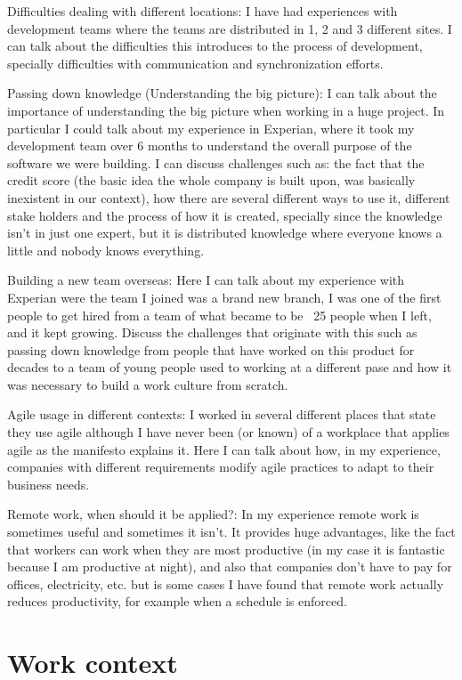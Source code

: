 \documentclass[12pt, letterpaper]{article}
\begin{document}
Difficulties dealing with different locations: I have had experiences with development teams where the teams are distributed in 1, 2 and 3 different sites. I can talk about the difficulties this introduces to the process of development, specially difficulties with communication and synchronization efforts.

Passing down knowledge (Understanding the big picture): I can talk about the importance of understanding the big picture when working in a huge project. In particular I could talk about my experience in Experian, where it took my development team over 6 months to understand the overall purpose of the software we were building. I can discuss challenges such as: the fact that the credit score (the basic idea the whole company is built upon, was basically inexistent in our context), how there are several different ways to use it, different stake holders and the process of how it is created, specially since the knowledge isn't in just one expert, but it is distributed knowledge where everyone knows a little and nobody knows everything.

Building a new team overseas: Here I can talk about my experience with Experian were the team I joined was a brand new branch, I was one of the first people to get hired from a team of what became to be ~25 people when I left, and it kept growing. Discuss the challenges that originate with this such as passing down knowledge from people that have worked on this product for decades to a team of young people used to working at a different pase and how it was necessary to build a work culture from scratch.

Agile usage in different contexts: I worked in several different places that state they use agile although I have never been (or known) of a  workplace that applies agile as the manifesto explains it. Here I can talk about how, in my experience, companies with different requirements modify agile practices to adapt to their business needs.

Remote work, when should it be applied?: In my experience remote work is sometimes useful and sometimes it isn't. It provides huge advantages, like the fact that workers can work when they are most productive (in my case it is fantastic because I am productive at night), and also that companies don't have to pay for offices, electricity, etc. but is some cases I have found that remote work actually reduces productivity, for example when a schedule is enforced.

 
\section{Work context}
\end{document}

